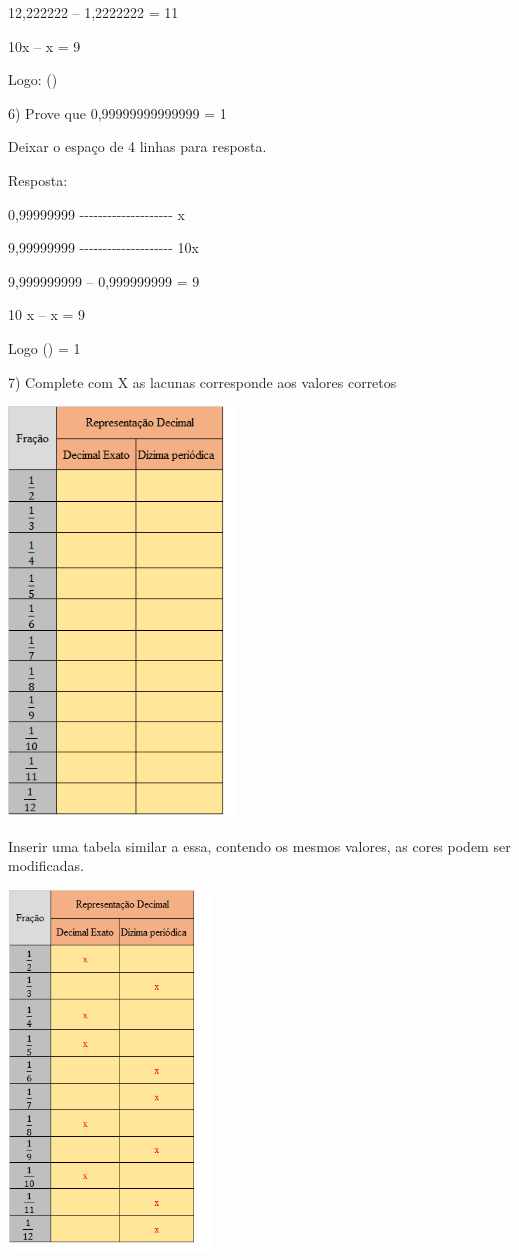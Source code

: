 12,222222 -- 1,2222222 = 11

10x -- x = 9

Logo: ()

6) Prove que 0,99999999999999 = 1

Deixar o espaço de 4 linhas para resposta.

Resposta:

0,99999999 -\/-\/-\/-\/-\/-\/-\/-\/-\/-\/-\/-\/-\/-\/-\/-\/-\/-\/-\/- x

9,99999999 -\/-\/-\/-\/-\/-\/-\/-\/-\/-\/-\/-\/-\/-\/-\/-\/-\/-\/-\/-
10x

9,999999999 -- 0,999999999 = 9

10 x -- x = 9

Logo () = 1

7) Complete com X as lacunas corresponde aos valores corretos

\includegraphics[width=2.37378in,height=4.29167in]{./imgSAEB_8_MAT/media/image3.png}

Inserir uma tabela similar a essa, contendo os mesmos valores, as cores
podem ser modificadas.

\includegraphics[width=2.14722in,height=3.775in]{./imgSAEB_8_MAT/media/image4.png}

